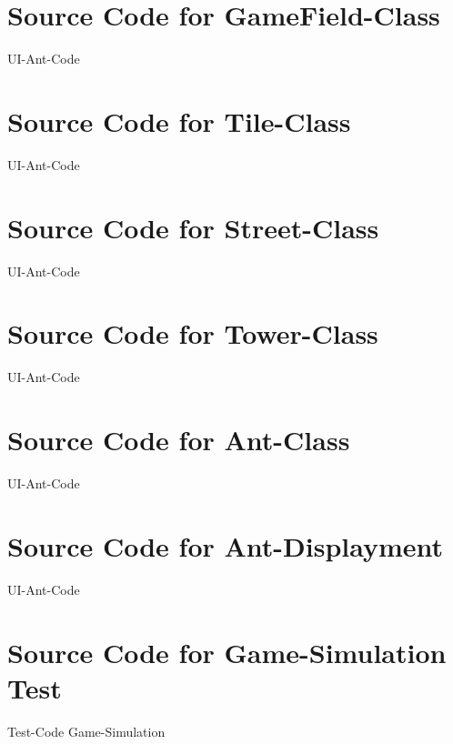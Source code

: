 \section{Source Code for GameField-Class}
\label{src:logicgame}
UI-Ant-Code

\section{Source Code for Tile-Class}
\label{src:logictile}
UI-Ant-Code

\section{Source Code for Street-Class}
\label{src:logicstreet}
UI-Ant-Code

\section{Source Code for Tower-Class}
\label{src:logictower}
UI-Ant-Code

\section{Source Code for Ant-Class}
\label{src:logicant}
UI-Ant-Code

\section{Source Code for Ant-Displayment}
\label{src:uiant}
UI-Ant-Code

\section{Source Code for Game-Simulation Test}
\label{src:testgamesim}
Test-Code Game-Simulation

